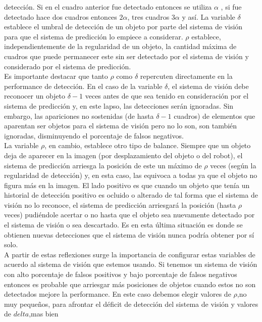 detección. Si en el cuadro anterior fue detectado entonces se utiliza 
$\alpha$ , si fue detectado hace dos cuadros entonces $2\alpha$, tres 
cuadros $3\alpha$ y así. La variable $\delta$ establece el umbral de 
detección de un objeto por parte del sistema de visión para que el 
sistema de predicción lo empiece  a considerar. $\rho$ establece, 
independientemente de la  
regularidad de un objeto, la cantidad máxima de cuadros que puede 
permanecer este sin ser detectado por el sistema de visión y 
considerado por el sistema de predicción. \\ 
\indent Es importante destacar que tanto $\rho$ como $\delta$ repercuten directamente en la 
performance de detección. En el caso de la variable $\delta$, el 
sistema de visión debe reconocer un objeto $\delta -1$ veces antes de que sea 
tenido en consideración por el sistema de predicción y, en este lapso, las 
detecciones serán ignoradas. Sin embargo, las apariciones no sostenidas 
(de hasta $\delta -1$ cuadros) de elementos que aparentan ser objetos 
para el sistema de visión pero no lo son, son también ignoradas, 
disminuyendo el porcentaje de falsos negativos.\\
\indent La variable $\rho$, en cambio, establece otro tipo de balance. 
	Siempre que un objeto deja de aparecer en la imagen (por 
	desplazamiento del objeto o del robot), el sistema de 
	predicción arriesga la posición de este un máximo de $\rho$ veces 
	(según la regularidad de detección) y, en esta caso, las equivoca a 
	todas ya que el objeto no figura más en la imagen. El lado 
	positivo es que cuando un objeto que tenía un historial de 
	detección positivo es ocluido o alterado de tal forma que el 
	sistema de visión no lo reconoce, el sistema de predicción 
	arriesgará la posición (hasta $\rho$ veces) pudiéndole acertar o no hasta que el objeto 
	sea nuevamente detectado por el sistema de visión o sea descartado. 
	Es en esta última situación es donde se obtienen nuevas detecciones que el sistema de visión 
	nunca podría obtener por sí solo.\\
	\indent A partir de estas reflexiones surge la importancia de configurar 
	estas variables de acuerdo al sistema de visión que estemos 
	usando. Si tenemos un sistema de visión con alto porcentaje de 
	falsos positivos y bajo porcentaje de falsos negativos entonces es 
	probable que arriesgar más posiciones de objetos cuando estos no 
	son detectados mejore la performance. En este caso debemos elegir 
	valores de $\rho$,no muy pequeños, para afrontar el déficit de 
	detección del sistema de visión  y valores de $delta$,mas bien 

